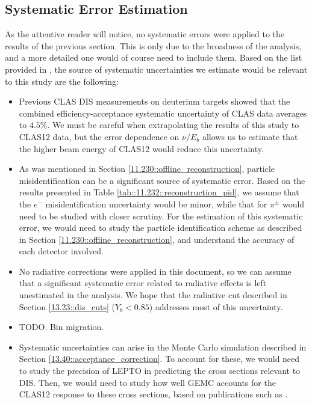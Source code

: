 \subsection{Systematic Error Estimation}
    \label{14.40::systematic_error_estimation}
    As the attentive reader will notice, no systematic errors were applied to the results of the previous section.
    This is only due to the broadness of the analysis, and a more detailed one would of course need to include them.
    Based on the list provided in \cite{osipenko2010}, the source of systematic uncertainties we estimate would be relevant to this study are the following:
    \begin{itemize}
        \item
            Previous CLAS DIS measurements \cite{osipenko2006} on deuterium targets showed that the combined efficiency-acceptance systematic uncertainty of CLAS data averages to $4.5\%$.
            We must be careful when extrapolating the results of this study to CLAS12 data, but the error dependence on $\nu/E_b$ allows us to estimate that the higher beam energy of CLAS12 would reduce this uncertainty.

        \item
            As was mentioned in Section \ref{11.230::offline_reconstruction}, particle misidentification can be a significant source of systematic error.
            Based on the results presented in Table \ref{tab::11.232::reconstruction_pid}, we assume that the $e^-$ misidentification uncertainty would be minor, while that for $\pi^\pm$ would need to be studied with closer scrutiny.
            For the estimation of this systematic error, we would need to study the particle identification scheme as described in Section \ref{11.230::offline_reconstruction}, and understand the accuracy of each detector involved.

        \item
            No radiative corrections were applied in this document, so we can assume that a significant systematic error related to radiative effects is left unestimated in the analysis.
            We hope that the radiative cut described in Section \ref{13.23::dis_cuts} ($Y_b < 0.85$) addresses most of this uncertainty.

        \item
            TODO. Bin migration.

        \item
            Systematic uncertainties can arise in the Monte Carlo simulation described in Section \ref{13.40::acceptance_correction}.
            To account for these, we would need to study the precision of LEPTO in predicting the cross sections relevant to DIS.
            Then, we would need to study how well GEMC accounts for the CLAS12 response to these cross sections, based on publications such as \cite{ungaro2020gemc}.


\end{itemize}
